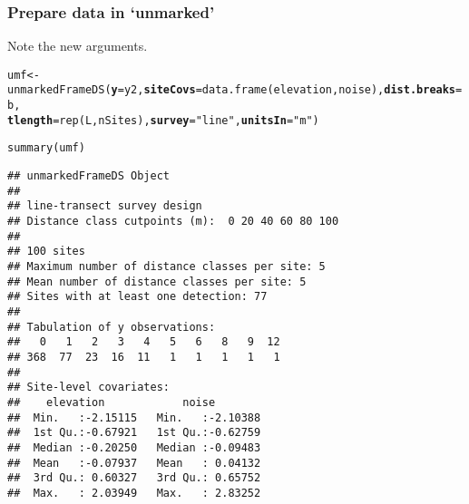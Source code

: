 \documentclass[color=usenames,dvipsnames]{beamer}\usepackage[]{graphicx}\usepackage[]{color}
\makeatletter
\newcommand{\hlstr}[1]{\textcolor[rgb]{0.749,0.012,0.012}{#1}}%
\newcommand{\hlstd}[1]{\textcolor[rgb]{0,0,0}{#1}}%
\newcommand{\hlkwb}[1]{\textcolor[rgb]{0,0.341,0.682}{#1}}%
\newcommand{\hlkwc}[1]{\textcolor[rgb]{0,0,0}{\textbf{#1}}}%
\newcommand{\hlkwd}[1]{\textcolor[rgb]{0.004,0.004,0.506}{#1}}%
\newenvironment{kframe}{%
 \def\at@end@of@kframe{}%
 \ifinner\ifhmode%
  \def\at@end@of@kframe{\end{minipage}}%
  \begin{minipage}{\columnwidth}%
 \fi\fi%
 \def\FrameCommand##1{\hskip\@totalleftmargin \hskip-\fboxsep
 \colorbox{shadecolor}{##1}\hskip-\fboxsep
     \hskip-\linewidth \hskip-\@totalleftmargin \hskip\columnwidth}%
 \MakeFramed {\advance\hsize-\width
   \@totalleftmargin\z@ \linewidth\hsize
   \@setminipage}}%
 {\par\unskip\endMakeFramed%
 \at@end@of@kframe}
\newenvironment{knitrout}{}{} %
\makeatother
\begin{document}
\begin{frame}[fragile]
  \frametitle{Prepare data in `unmarked'}
  \small
  Note the new arguments. 
\begin{knitrout}\tiny
{}\color{fgcolor}\begin{kframe}
\begin{alltt}
\hlstd{umf} \hlkwb{<-} \hlkwd{unmarkedFrameDS}\hlstd{(}\hlkwc{y}\hlstd{=y2,} \hlkwc{siteCovs}\hlstd{=}\hlkwd{data.frame}\hlstd{(elevation,noise),} \hlkwc{dist.breaks}\hlstd{=b,}
                       \hlkwc{tlength}\hlstd{=}\hlkwd{rep}\hlstd{(L, nSites),} \hlkwc{survey}\hlstd{=}\hlstr{"line"}\hlstd{,} \hlkwc{unitsIn}\hlstd{=}\hlstr{"m"}\hlstd{)}
\end{alltt}
\end{kframe}
\end{knitrout}
\pause
\begin{knitrout}\tiny
{}\color{fgcolor}\begin{kframe}
\begin{alltt}
\hlkwd{summary}\hlstd{(umf)}
\end{alltt}
\begin{verbatim}
## unmarkedFrameDS Object
## 
## line-transect survey design
## Distance class cutpoints (m):  0 20 40 60 80 100 
## 
## 100 sites
## Maximum number of distance classes per site: 5 
## Mean number of distance classes per site: 5 
## Sites with at least one detection: 77 
## 
## Tabulation of y observations:
##   0   1   2   3   4   5   6   8   9  12 
## 368  77  23  16  11   1   1   1   1   1 
## 
## Site-level covariates:
##    elevation            noise         
##  Min.   :-2.15115   Min.   :-2.10388  
##  1st Qu.:-0.67921   1st Qu.:-0.62759  
##  Median :-0.20250   Median :-0.09483  
##  Mean   :-0.07937   Mean   : 0.04132  
##  3rd Qu.: 0.60327   3rd Qu.: 0.65752  
##  Max.   : 2.03949   Max.   : 2.83252
\end{verbatim}
\end{kframe}
\end{knitrout}
\end{frame}



\end{document}
